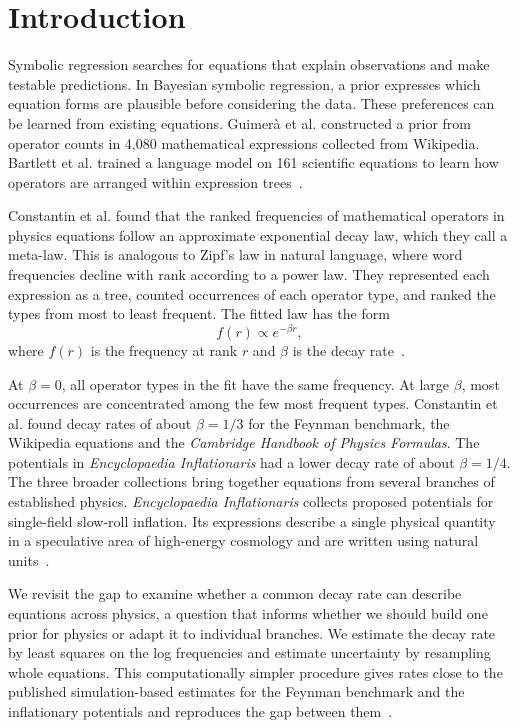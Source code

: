 \documentclass[10pt]{article}
\begin{document}
\section{Introduction}
Symbolic regression searches for equations that explain observations and make testable predictions. In Bayesian symbolic regression, a prior expresses which equation forms are plausible before considering the data. These preferences can be learned from existing equations. Guimer\`a et al. constructed a prior from operator counts in 4,080 mathematical expressions collected from Wikipedia. Bartlett et al. trained a language model on 161 scientific equations to learn how operators are arranged within expression trees~\citep{guimera2020,bartlett2023}.

Constantin et al. found that the ranked frequencies of mathematical operators in physics equations follow an approximate exponential decay law, which they call a meta-law. This is analogous to Zipf's law in natural language, where word frequencies decline with rank according to a power law. They represented each expression as a tree, counted occurrences of each operator type, and ranked the types from most to least frequent. The fitted law has the form
\[
f(r)\propto e^{-\beta r},
\]
where $f(r)$ is the frequency at rank $r$ and $\beta$ is the decay rate~\citep{constantin2026}.

At $\beta=0$, all operator types in the fit have the same frequency. At large $\beta$, most occurrences are concentrated among the few most frequent types. Constantin et al. found decay rates of about $\beta=1/3$ for the Feynman benchmark, the Wikipedia equations and the \textit{Cambridge Handbook of Physics Formulas}. The potentials in \textit{Encyclopaedia Inflationaris} had a lower decay rate of about $\beta=1/4$. The three broader collections bring together equations from several branches of established physics. \textit{Encyclopaedia Inflationaris} collects proposed potentials for single-field slow-roll inflation. Its expressions describe a single physical quantity in a speculative area of high-energy cosmology and are written using natural units~\citep{constantin2026,martin2014}.

We revisit the gap to examine whether a common decay rate can describe equations across physics, a question that informs whether we should build one prior for physics or adapt it to individual branches. We estimate the decay rate by least squares on the log frequencies and estimate uncertainty by resampling whole equations. This computationally simpler procedure gives rates close to the published simulation-based estimates for the Feynman benchmark and the inflationary potentials and reproduces the gap between them~\citep{constantin2026}.
\end{document}

